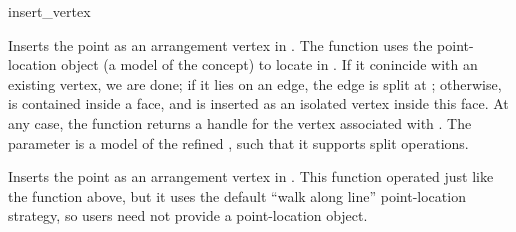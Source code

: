 
\begin{ccRefFunction}{insert_vertex}


   {Inserts the point  as an arrangement vertex in .
    The function uses the point-location object  (a model of the
     concept) to locate  in .
    If it conincide with an existing vertex, we are done; if it lies on an
    edge, the edge is split at ; otherwise,  is contained inside
    a face, and is inserted as an isolated vertex inside this face.
    At any case, the function returns a handle for the vertex associated
    with . The  parameter is a model of the refined
    , such that it supports split operations.
    }

   {Inserts the point  as an arrangement vertex in .
    This function operated just like the function above, but it uses the
    default ``walk along line'' point-location strategy, so users need not
    provide a point-location object.} 

\end{ccRefFunction}
